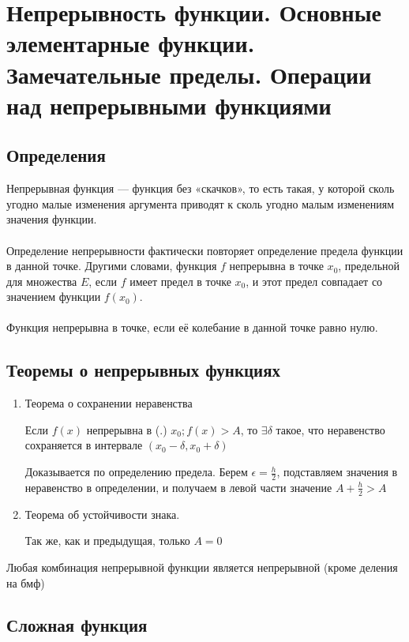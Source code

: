 \section{Непрерывность функции. Основные элементарные функции. Замечательные пределы. Операции над непрерывными функциями}

\subsection{Определения}

Непрерывная функция — функция без «скачков», то есть такая, у которой сколь угодно малые изменения аргумента приводят к сколь угодно малым изменениям значения функции.
\\\\
Определение непрерывности фактически повторяет определение предела функции в данной точке. Другими словами, функция $f$ непрерывна в точке $x_0$, предельной для множества $E$, если $f$ имеет предел в точке $x_0$, и этот предел совпадает со значением функции $f(x_0)$.
\\\\
Функция непрерывна в точке, если её колебание в данной точке равно нулю.

\subsection{Теоремы о непрерывных функциях}

\begin{enumerate}

\item 
Теорема о сохранении неравенства

Если $ f(x) $ непрерывна в (.) $ x_0;  f(x) > A $, то $ \exists \delta $ такое, что 
неравенство сохраняется в интервале $ (x_0 - \delta , x_0 + \delta) $

Доказывается по определению предела. Берем $ \epsilon = \frac{h}{2} $, подставляем значения в неравенство в определении, и получаем в левой части значение $ A + \frac{h}{2} > A $

\item 
Теорема об устойчивости знака.

Так же, как и предыдущая, только $ A = 0 $

\end{enumerate}

Любая комбинация непрерывной функции является непрерывной (кроме деления на бмф)

\subsection{Сложная функция}

